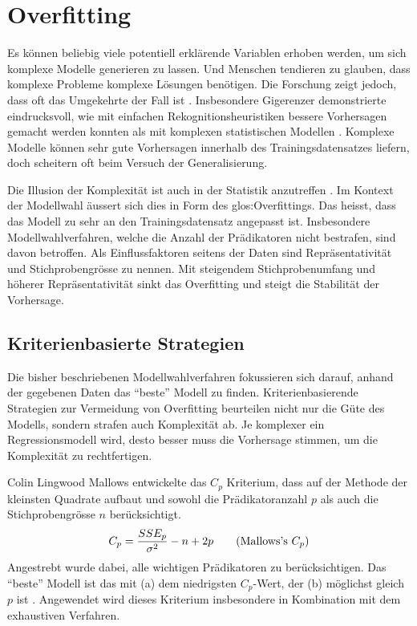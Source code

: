 \section{Overfitting}
Es können beliebig viele potentiell erklärende Variablen erhoben werden, um sich komplexe Modelle generieren zu lassen. 
Und Menschen tendieren zu glauben, dass komplexe Probleme komplexe Lösungen benötigen. 
Die Forschung zeigt jedoch, dass oft das Umgekehrte der Fall ist \cite[p.3]{armstrong2011illusions}. 
Insbesondere Gigerenzer demonstrierte eindrucksvoll, wie mit einfachen Rekognitionsheuristiken bessere Vorhersagen gemacht werden konnten als mit komplexen statistischen Modellen \cite{borges1999can}.
Komplexe Modelle können sehr gute Vorhersagen innerhalb des Trainingsdatensatzes liefern, doch  scheitern oft beim Versuch der Generalisierung.  

Die Illusion der Komplexität ist auch in der Statistik anzutreffen \cite[p. 3]{armstrong2011illusions}. 
Im Kontext der Modellwahl äussert sich dies in Form des  \Gls{glos:Overfitting}s. Das heisst, dass das Modell zu sehr an den Trainingsdatensatz angepasst ist.
Insbesondere Modellwahlverfahren, welche die Anzahl der Prädikatoren nicht bestrafen, sind davon betroffen.
Als Einflussfaktoren seitens der Daten sind Repräsentativität und Stichprobengrösse zu nennen. 
Mit steigendem Stichprobenumfang und höherer Repräsentativität sinkt das Overfitting und steigt die Stabilität der Vorhersage.

\subsection{Kriterienbasierte Strategien}
Die bisher beschriebenen Modellwahlverfahren fokussieren sich darauf, anhand der gegebenen Daten das ``beste'' Modell zu finden.
Kriterienbasierende Strategien zur Vermeidung von Overfitting beurteilen nicht nur die Güte des Modells, sondern strafen auch Komplexität ab.
Je komplexer ein Regressionsmodell wird, desto besser muss die Vorhersage stimmen, um die Komplexität zu rechtfertigen.

Colin Lingwood Mallows entwickelte das $C_p$ Kriterium, dass auf der Methode der kleinsten Quadrate  aufbaut und sowohl die Prädikatoranzahl $p$ als auch die Stichprobengrösse $n$ berücksichtigt. 
\begin{equation}
C_p={SSE_p \over \sigma^2} - n + 2p
\tag{Mallows's $C_p$}
\end{equation}
Angestrebt wurde dabei, alle wichtigen Prädikatoren zu berücksichtigen. 
Das ``beste'' Modell ist das mit (a) dem niedrigsten $C_p$-Wert, der (b) möglichst gleich $p$ ist \cite{gilmour1996interpretation}. Angewendet wird dieses Kriterium insbesondere in Kombination mit dem exhaustiven Verfahren.

